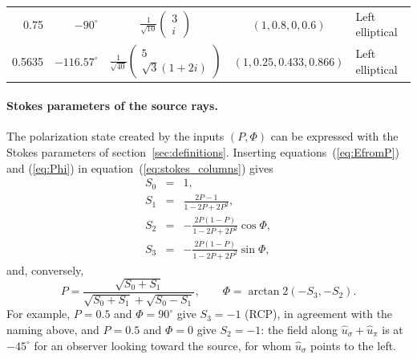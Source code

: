 \documentclass{iucr}
\begin{document}
\begin{table}
\begin{tabular}{rr c c l}
\hline
0.75 & $-90^\circ$ & $\frac{1}{\sqrt{10}}\left(\begin{smallmatrix}3\\i\end{smallmatrix}\right)$ & $(1,0.8,0,0.6)$ & Left elliptical \\
0.5635 & $-116.57^\circ$ & $\frac{1}{\sqrt{40}}\left(\begin{smallmatrix}5\\\sqrt{3}(1+2i)\end{smallmatrix}\right)$ & $(1,0.25,0.433,0.866)$ & Left elliptical \\
\hline
\end{tabular}
\end{table}

\paragraph{Stokes parameters of the source rays.}
The polarization state created by the inputs $(P,\Phi)$ can be expressed with the Stokes parameters of section~\ref{sec:definitions}. Inserting equations~(\ref{eq:EfromP}) and (\ref{eq:Phi}) in equation~(\ref{eq:stokes_columns}) gives
\begin{eqnarray}\label{eq:stokes_from_P}
    S_0 &=& 1, \nonumber \\
    S_1 &=& \frac{2P-1}{1-2P+2P^2}, \nonumber \\
    S_2 &=& -\frac{2P(1-P)}{1-2P+2P^2}\cos\Phi, \nonumber \\
    S_3 &=& -\frac{2P(1-P)}{1-2P+2P^2}\sin\Phi,
\end{eqnarray}
and, conversely,
\begin{equation}\label{eq:P_from_stokes}
    P = \frac{\sqrt{S_0+S_1}}{\sqrt{S_0+S_1}+\sqrt{S_0-S_1}}, \qquad
    \Phi = \arctan2(-S_3, -S_2).
\end{equation}
For example, $P=0.5$ and $\Phi=90^\circ$ give $S_3=-1$ (RCP), in agreement with the naming above, and $P=0.5$ and $\Phi=0$ give $S_2=-1$: the field along $\hat{u}_\sigma+\hat{u}_\pi$ is at $-45^\circ$ for an observer looking toward the source, for whom $\hat{u}_\sigma$ points to the left.
\end{document}
